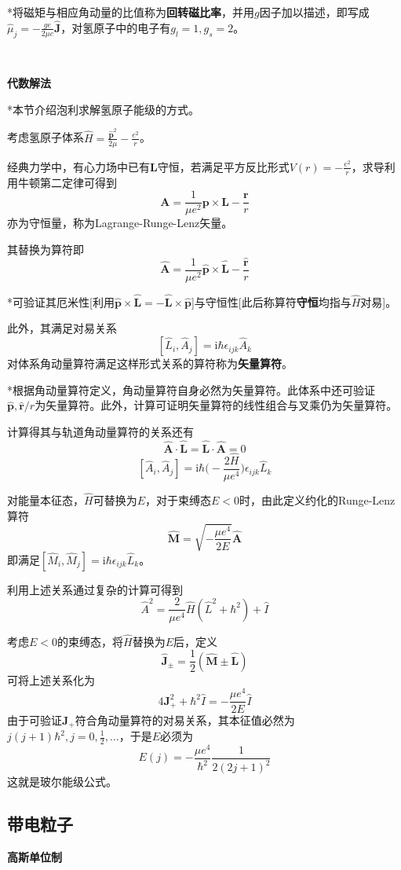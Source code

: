 \documentclass[a4paper,UTF8,fontset=windows]{ctexart}
\newcommand*{\ir}{\mathrm{i}}
\newcommand*{\br}{\mathbf{r}}
\newcommand*{\bp}{\mathbf{p}}
\newcommand*{\ba}{\mathbf{A}}
\newcommand*{\bj}{\mathbf{J}}
\begin{document}
*将磁矩与相应角动量的比值称为\textbf{回转磁比率}，并用$g$因子加以描述，即写成$\hat{\mu}_j=-\frac{ge}{2\mu c}\hat{\bj}$，对氢原子中的电子有$g_l=1,g_s=2$。

\

\textbf{代数解法}

*本节介绍泡利求解氢原子能级的方式。

考虑氢原子体系$\hat{H}=\frac{\hat{\bp}^2}{2\mu}-\frac{e^2}{r}$。

经典力学中，有心力场中已有$\mathbf{L}$守恒，若满足平方反比形式$V(r)=-\frac{e^2}{r}$，求导利用牛顿第二定律可得到
$$\ba=\frac{1}{\mu e^2}\bp\times\mathbf{L}-\frac{\br}{r}$$
亦为守恒量，称为Lagrange-Runge-Lenz矢量。

其替换为算符即
$$\hat{\ba}=\frac{1}{\mu e^2}\hat{\bp}\times\hat{\mathbf{L}}-\frac{\hat{\br}}{r}$$

*可验证其厄米性[利用$\hat{\bp}\times\hat{\mathbf{L}}=-\hat{\mathbf{L}}\times\hat{\bp}$]与守恒性[此后称算符\textbf{守恒}均指与$\hat{H}$对易]。

此外，其满足对易关系
$$[\hat{L}_i,\hat{A}_j]=\ir\hbar\epsilon_{ijk}\hat{A}_k$$
对体系角动量算符满足这样形式关系的算符称为\textbf{矢量算符}。

*根据角动量算符定义，角动量算符自身必然为矢量算符。此体系中还可验证$\hat{\bp},\hat{\br}/r$为矢量算符。此外，计算可证明矢量算符的线性组合与叉乘仍为矢量算符。

计算得其与轨道角动量算符的关系还有
$$\hat{\ba}\cdot\hat{\mathbf{L}}=\hat{\mathbf{L}}\cdot\hat{\ba}=0$$
$$[\hat{A}_i,\hat{A}_j]=\ir\hbar\bigg(-\frac{2\hat{H}}{\mu e^4}\bigg)\epsilon_{ijk}\hat{L}_k$$

对能量本征态，$\hat{H}$可替换为$E$，对于束缚态$E<0$时，由此定义约化的Runge-Lenz算符
$$\hat{\mathbf{M}}=\sqrt{-\frac{\mu e^4}{2E}}\hat{\ba}$$
即满足$[\hat{M}_i,\hat{M}_j]=\ir\hbar\epsilon_{ijk}\hat{L}_k$。

利用上述关系通过复杂的计算可得到
$$\hat{A}^2=\frac{2}{\mu e^4}\hat{H}(\hat{L}^2+\hbar^2)+\hat{I}$$

考虑$E<0$的束缚态，将$\hat{H}$替换为$E$后，定义
$$\hat{\bj}_\pm=\frac{1}{2}(\hat{\mathbf{M}}\pm\hat{\mathbf{L}})$$
可将上述关系化为
$$4\mathbf{J}_+^2+\hbar^2\hat{I}=-\frac{\mu e^4}{2E}\hat{I}$$
由于可验证$\mathbf{J}_+$符合角动量算符的对易关系，其本征值必然为$j(j+1)\hbar^2,j=0,\frac{1}{2},\dots$，于是$E$必须为
$$E(j)=-\frac{\mu e^4}{\hbar^2}\frac{1}{2(2j+1)^2}$$
这就是玻尔能级公式。

\subsection{带电粒子}
\textbf{高斯单位制}
\end{document}
